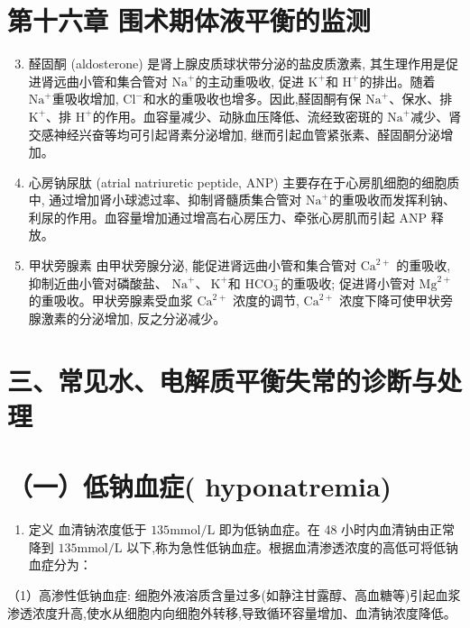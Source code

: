 \documentclass[10pt]{article}
\begin{document}
\section*{第十六章 围术期体液平衡的监测}
\begin{enumerate}
  \setcounter{enumi}{2}
  \item 醛固酮 (aldosterone) 是肾上腺皮质球状带分泌的盐皮质激素, 其生理作用是促进肾远曲小管和集合管对 $\mathrm{Na}^{+}$的主动重吸收, 促进 $\mathrm{K}^{+}$和 $\mathrm{H}^{+}$的排出。随着 $\mathrm{Na}^{+}$重吸收增加, $\mathrm{Cl}^{-}$和水的重吸收也增多。因此,醛固酮有保 $\mathrm{Na}^{+}$、保水、排 $\mathrm{K}^{+}$、排 $\mathrm{H}^{+}$的作用。血容量减少、动脉血压降低、流经致密斑的 $\mathrm{Na}^{+}$减少、肾交感神经兴奋等均可引起肾素分泌增加, 继而引起血管紧张素、醛固酮分泌增加。

  \item 心房钠尿肽 (atrial natriuretic peptide, ANP) 主要存在于心房肌细胞的细胞质中, 通过增加肾小球滤过率、抑制肾髓质集合管对 $\mathrm{Na}^{+}$的重吸收而发挥利钠、利尿的作用。血容量增加通过增高右心房压力、牵张心房肌而引起 ANP 释放。

  \item 甲状旁腺素 由甲状旁腺分泌, 能促进肾远曲小管和集合管对 $\mathrm{Ca}^{2+}$ 的重吸收, 抑制近曲小管对磷酸盐、 $\mathrm{Na}^{+} 、 \mathrm{~K}^{+}$和 $\mathrm{HCO}_{3}^{-}$的重吸收; 促进肾小管对 $\mathrm{Mg}^{2+}$ 的重吸收。甲状旁腺素受血浆 $\mathrm{Ca}^{2+}$ 浓度的调节, $\mathrm{Ca}^{2+}$ 浓度下降可使甲状旁腺激素的分泌增加, 反之分泌减少。

\end{enumerate}

\section*{三、常见水、电解质平衡失常的诊断与处理}
\section*{（一）低钠血症( hyponatremia)}
\begin{enumerate}
  \item 定义 血清钠浓度低于 $135 \mathrm{mmol} / \mathrm{L}$ 即为低钠血症。在 48 小时内血清钠由正常降到 $135 \mathrm{mmol} / \mathrm{L}$ 以下,称为急性低钠血症。根据血清渗透浓度的高低可将低钠血症分为：
\end{enumerate}

（1）高渗性低钠血症: 细胞外液溶质含量过多(如静注甘露醇、高血糖等)引起血浆渗透浓度升高,使水从细胞内向细胞外转移,导致循环容量增加、血清钠浓度降低。
\end{document}

